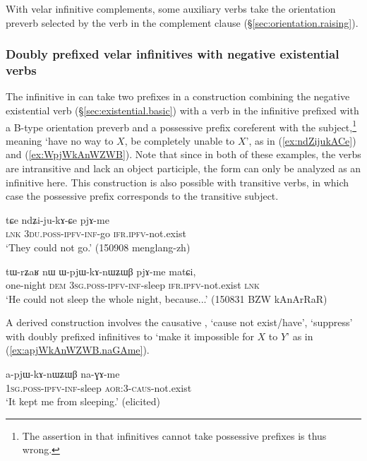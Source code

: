 With velar infinitive complements, some auxiliary verbs take the orientation preverb selected by the verb in the complement clause (§\ref{sec:orientation.raising}).
 

\subsubsection{Doubly prefixed velar infinitives with negative existential verbs} \label{sec:inf.exist}
The infinitive in  can take two prefixes in a construction combining the negative existential verb  (§\ref{sec:existential.basic}) with a verb in the infinitive prefixed with a B-type orientation preverb and a possessive prefix coreferent with the subject,\footnote{The assertion in \citet[228]{jacques16complementation} that infinitives cannot take possessive prefixes is thus wrong.} meaning `have no way to $X$, be completely unable to $X$', as in (\ref{ex:ndZijukACe}) and (\ref{ex:WpjWkAnWZWB}). Note that since in both of these examples, the verbs are intransitive and lack an object participle, the  form can only be analyzed as an infinitive here. This construction is also possible with transitive verbs, in which case the possessive prefix corresponds to the transitive subject.

\begin{exe}
\ex \label{ex:ndZijukACe}
\gll tɕe ndʑi-ju-kɤ-ɕe pjɤ-me \\
\textsc{lnk} \textsc{3du}.\textsc{poss}-\textsc{ipfv}-\textsc{inf}-go \textsc{ifr}.\textsc{ipfv}-not.exist \\
\glt `They could not go.' (150908 menglang-zh) 
\end{exe} 

\begin{exe}
\ex \label{ex:WpjWkAnWZWB}
\gll tɯ-rʑaʁ nɯ ɯ-pjɯ-kɤ-nɯʑɯβ pjɤ-me matɕi, \\
one-night \textsc{dem} \textsc{3sg}.\textsc{poss}-\textsc{ipfv}-\textsc{inf}-sleep \textsc{ifr}.\textsc{ipfv}-not.exist \textsc{lnk} \\
\glt `He could not sleep the whole night, because...' (150831 BZW kAnArRaR)
\end{exe}

A derived construction involves the causative , `cause not exist/have', `suppress' with doubly prefixed infinitives to `make it impossible for $X$ to $Y$' as in (\ref{ex:apjWkAnWZWB.naGAme}).

\begin{exe}
\ex \label{ex:apjWkAnWZWB.naGAme}
\gll a-pjɯ-kɤ-nɯʑɯβ na-ɣɤ-me \\
\textsc{1sg}.\textsc{poss}-\textsc{ipfv}-\textsc{inf}-sleep \textsc{aor}:3\flobv{}-\textsc{caus}-not.exist \\
\glt `It kept me from sleeping.' (elicited)
\end{exe}

